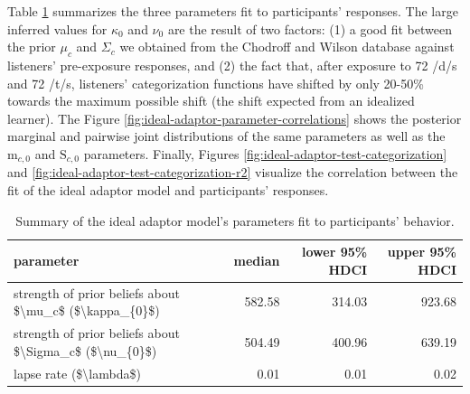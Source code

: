 \documentclass[
  11pt,
  man,mask,floatsintext]{apa6}
\begin{document}
Table \ref{tab:ideal-adaptor-parameter-summary} summarizes the three parameters fit to participants' responses. The large inferred values for \(\kappa_{0}\) and \(\nu_{0}\) are the result of two factors: (1) a good fit between the prior \(\mu_{c}\) and \(\Sigma_c\) we obtained from the Chodroff and Wilson database against listeners' pre-exposure responses, and (2) the fact that, after exposure to 72 /d/s and 72 /t/s, listeners' categorization functions have shifted by only 20-50\% towards the maximum possible shift (the shift expected from an idealized learner). The Figure \ref{fig:ideal-adaptor-parameter-correlations} shows the posterior marginal and pairwise joint distributions of the same parameters as well as the \(\mathrm{m}_{c,0}\) and \(\mathrm{S}_{c,0}\) parameters. Finally, Figures \ref{fig:ideal-adaptor-test-categorization} and \ref{fig:ideal-adaptor-test-categorization-r2} visualize the correlation between the fit of the ideal adaptor model and participants' responses.

\begin{table}

\caption{\label{tab:ideal-adaptor-parameter-summary}Summary of the ideal adaptor model's parameters fit to participants' behavior.}
\centering
\begin{tabular}[t]{l|r|r|r}
\hline
parameter & median & lower 95\% HDCI & upper 95\% HDCI\\
\hline
strength of prior beliefs about \$\textbackslash{}mu\_c\$ (\$\textbackslash{}kappa\_\{0\}\$) & 582.58 & 314.03 & 923.68\\
\hline
strength of prior beliefs about \$\textbackslash{}Sigma\_c\$ (\$\textbackslash{}nu\_\{0\}\$) & 504.49 & 400.96 & 639.19\\
\hline
lapse rate (\$\textbackslash{}lambda\$) & 0.01 & 0.01 & 0.02\\
\hline
\end{tabular}
\end{table}
\end{document}
